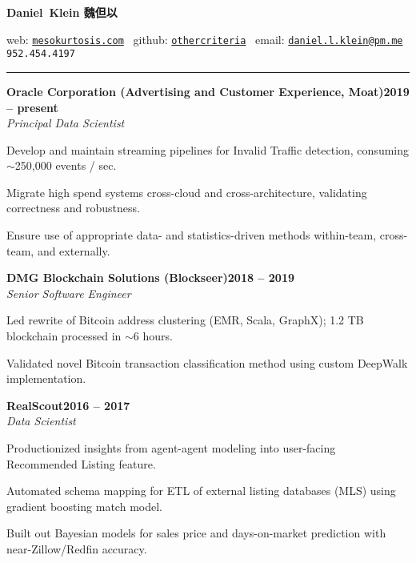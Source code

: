 \documentclass{article}
\newcommand{\ressection}[1]{\noindent{\large\textbf{#1}}\vspace{2pt}\hrule\vspace{4pt}}
\newcommand{\leftandright}[2]{\noindent\textbf{#1}\hfill\textbf{#2}}
\begin{document}
\sffamily

\noindent
\begin{center}
    
\textbf{\huge{Daniel~Klein 魏但以}}

web: \href{http://mesokurtosis.com}{\texttt{mesokurtosis.com}}
\textbullet\,
github: \href{https://github.com/othercriteria}{\texttt{othercriteria}}
\textbullet\,
email: \href{mailto:daniel.l.klein@proton.me}{\texttt{daniel.l.klein@pm.me}}
\textbullet\,
\texttt{952.454.4197}

\end{center}

\ressection{Experience}

\leftandright{Oracle Corporation (Advertising and Customer Experience, Moat)}{2019 -- present} \\
\textit{Principal Data Scientist}

\begin{itemize*}
\item Develop and maintain streaming pipelines for Invalid Traffic
  detection, consuming $\sim$250,000 events / sec.
\item Migrate high spend systems cross-cloud and cross-architecture,
  validating correctness and robustness.
\item Ensure use of appropriate data- and statistics-driven methods
  within-team, cross-team, and externally.
\end{itemize*}

\leftandright{DMG Blockchain Solutions (Blockseer)}{2018 -- 2019} \\
\textit{Senior Software Engineer}

\begin{itemize*}
\item Led rewrite of Bitcoin address clustering (EMR, Scala, GraphX);
  1.2 TB blockchain processed in $\sim$6 hours.
\item Validated novel Bitcoin transaction classification method using
  custom DeepWalk implementation.
\end{itemize*}

\leftandright{RealScout}{2016 -- 2017} \\
\textit{Data Scientist}

\begin{itemize*}
\item Productionized insights from agent-agent modeling into
  user-facing Recommended Listing feature.
\item Automated schema mapping for ETL of external listing databases
  (MLS) using gradient boosting match model.
\item Built out Bayesian models for sales price and days-on-market
  prediction with near-Zillow/Redfin accuracy.
\end{itemize*}
\end{document}
